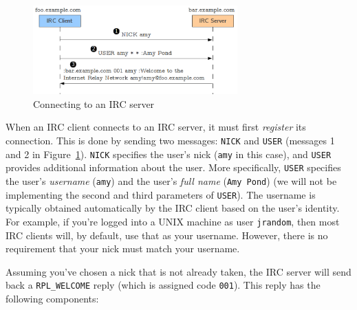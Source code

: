 \documentclass[10pt]{article}
\begin{document}
\begin{figure}
\begin{center}
\includegraphics[width=0.7\textwidth]{connect.png}
\caption{Connecting to an IRC server}
\label{fig:connect}
\end{center}
\end{figure}

When an IRC client connects to an IRC server, it must first \emph{register} its connection. This is done by sending two messages: \texttt{NICK} and \texttt{USER} (messages 1 and 2 in Figure~\ref{fig:connect}). \texttt{NICK} specifies the user's nick (\texttt{amy} in this case), and \texttt{USER} provides additional information about the user. More specifically, \texttt{USER} specifies the user's \emph{username} (\texttt{amy}) and the user's \emph{full name} (\texttt{Amy Pond}) (we will not be implementing the second and third parameters of \texttt{USER}). The username is typically obtained automatically by the IRC client based on the user's identity. For example, if you're logged into a UNIX machine as user \texttt{jrandom}, then most IRC clients will, by default, use that as your username. However, there is no requirement that your nick must match your username.

Assuming you've chosen a nick that is not already taken, the IRC server will send back a \texttt{RPL\_WELCOME} reply (which is assigned code \texttt{001}). This reply has the following components:
\end{document}
